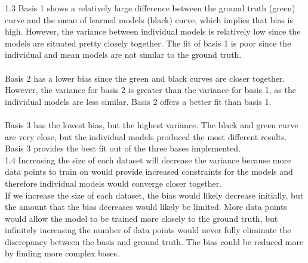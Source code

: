 \documentclass[submit]{harvardml}
\begin{document}
1.3 Basis 1 shows a relatively large difference between the ground truth (green) curve and the mean of learned models (black) curve, which implies that bias is high. However, the variance between individual models is relatively low since the models are situated pretty closely together. The fit of basis 1 is poor since the individual and mean models are not similar to the ground truth.\\\\
Basis 2 has a lower bias since the green and black curves are closer together. However, the variance for basis 2 is greater than the variance for basis 1, as the individual models are less similar. Basis 2 offers a better fit than basis 1.\\\\
Basis 3 has the lowest bias, but the highest variance. The black and green curve are very close, but the individual models produced the most different results. Basis 3 provides the best fit out of the three bases implemented.\\



1.4 Increasing the size of each dataset will decrease the variance because more data points to train on would provide increased constraints for the models and therefore individual models would converge closer together.\\
If we increase the size of each dataset, the bias would likely decrease initially, but the amount that the bias decreases would likely be limited. More data points would allow the model to be trained more closely to the ground truth, but infinitely increasing the number of data points would never fully eliminate the discrepancy between the basis and ground truth. The bias could be reduced more by finding more complex bases.

\end{document}

